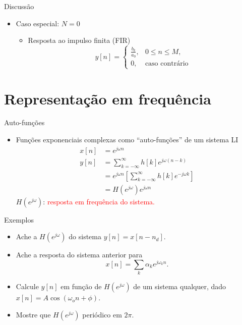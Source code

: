 \documentclass[
size=17pt,
paper=smartboard,
mode=present,
display=slidesnotes,
style=sailor,
nopagebreaks,
blackslide,
fleqn]{powerdot}
\begin{document}
\begin{slide}[toc=]{Discussão}
   \begin{itemize}
      \item Caso especial: $N=0$
      \begin{itemize}
         \item Resposta ao impulso finita (FIR)
         \begin{equation*}
            y[n]=\begin{cases}
                    \frac{b_k}{a_0}, & 0\leq n \leq M,\\
                    0              , & \text{caso contrário}
                 \end{cases}
         \end{equation*}
      \end{itemize}
   \end{itemize}
\end{slide}


\section[slide=true]{Representação em frequência}
 \begin{slide}[toc=]{Auto-funções}
\begin{itemize}
 \item Funções exponenciais complexas como ``auto-funções'' de um sistema LI
 \begin{align*}
   x[n]&=e^{j\omega n}\\
   y[n]&=\sum_{k=-\infty}^{\infty}h[k]e^{j\omega (n-k)}\\
       &=e^{j\omega n}\left [\sum_{k=-\infty}^{\infty}h[k]e^{-j\omega k} \right ]\\
       &= H(e^{j\omega})e^{j\omega n}
 \end{align*}%
 $H(e^{j\omega})$: \textcolor{red}{resposta em frequência do sistema.}
\end{itemize}
\end{slide}

\begin{slide}[toc=]{Exemplos}
\begin{itemize}
   \item Ache a $H(e^{j\omega})$ do sistema $y[n]=x[n-n_d]$.
   \item Ache a resposta do sistema anterior para \begin{equation*}
                                                     x[n]=\sum_k \alpha_k e^{j\omega_k n}.
                                                    \end{equation*}
   \item Calcule $y[n]$ em função de $H(e^{j\omega})$ de um sistema qualquer, dado $x[n]=A\cos(\omega_o n+\phi)$.
   \item Mostre que $H(e^{j\omega})$  periódico em $2\pi$.
\end{itemize}
\end{slide}
\end{document}
